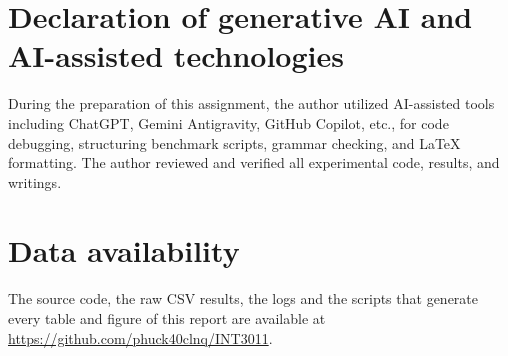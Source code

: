\documentclass[a4paper,fleqn]{cas-sc}
\begin{document}
\section*{Declaration of generative AI and AI-assisted technologies}
During the preparation of this assignment, the author utilized AI-assisted tools including ChatGPT, Gemini Antigravity, GitHub Copilot, etc., for code debugging, structuring benchmark scripts, grammar checking, and LaTeX formatting. The author reviewed and verified all experimental code, results, and writings.

\section*{Data availability}\label{sec:data}
The source code, the raw CSV results, the logs and the scripts that generate every table and figure of this report are available at \url{https://github.com/phuck40clnq/INT3011}.



\end{document}
